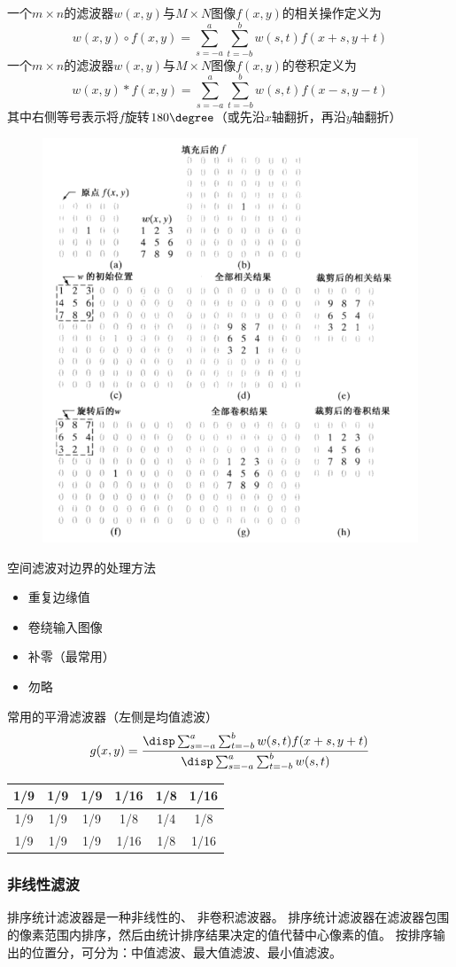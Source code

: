 \begin{definition}[相关与卷积]
一个$m\times n$的滤波器$w(x,y)$与$M\times N$图像$f(x,y)$的相关操作定义为
\[w(x,y)\circ f(x,y)=\sum_{s=-a}^a\sum_{t=-b}^b w(s,t)f(x+s,y+t)\]
一个$m\times n$的滤波器$w(x,y)$与$M\times N$图像$f(x,y)$的卷积定义为
\[w(x,y)*f(x,y)=\sum_{s=-a}^a\sum_{t=-b}^b w(s,t)f(x-s,y-t)\]
其中右侧等号表示将$f$旋转$180\degree$（或先沿$x$轴翻折，再沿$y$轴翻折）
\end{definition}
\begin{figure}[H]
\centering
\includegraphics[width=0.5\linewidth]{fig/convolution_and_correlation.png}
\end{figure}

空间滤波对边界的处理方法
\begin{itemize}
	\item 重复边缘值
	\item 卷绕输入图像
	\item 补零（最常用）
	\item 勿略
\end{itemize}

常用的平滑滤波器（左侧是均值滤波）
\[g(x,y)=\frac{\disp\sum_{s=-a}^a\sum_{t=-b}^b w(s,t)f(x+s,y+t)}{\disp\sum_{s=-a}^a\sum_{t=-b}^b w(s,t)}\]
\begin{center}
\begin{tabular}{|c|c|c||c|c|c|}\hline
1/9 & 1/9 & 1/9 & 1/16 & 1/8 & 1/16\\\hline
1/9 & 1/9 & 1/9 & 1/8 & 1/4 & 1/8 \\\hline
1/9 & 1/9 & 1/9 & 1/16 & 1/8 & 1/16\\\hline
\end{tabular}
\end{center}

\subsubsection{非线性滤波}
排序统计滤波器是一种非线性的、 非卷积滤波器。
排序统计滤波器在滤波器包围的像素范围内排序，然后由统计排序结果决定的值代替中心像素的值。
按排序输出的位置分，可分为：中值滤波、最大值滤波、最小值滤波。

